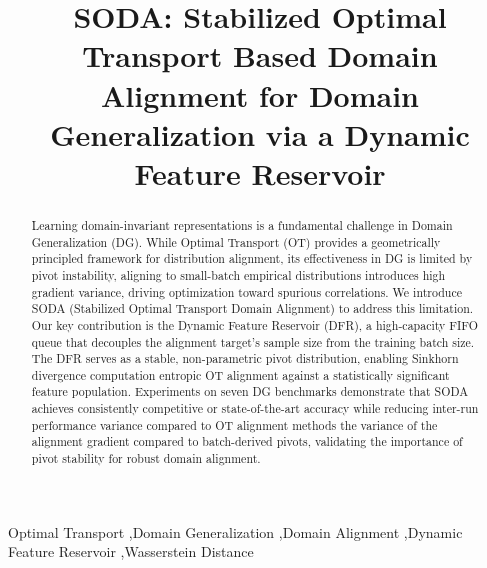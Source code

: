 \documentclass[preprint,12pt]{elsarticle}
\providecommand{\DIFadd}[1]{{\protect\color{blue} \sf #1}} %
\providecommand{\DIFdel}[1]{{\protect\color{red} \scriptsize #1}} %
\providecommand{\DIFaddbegin}{} %
\providecommand{\DIFaddend}{} %
\providecommand{\DIFdelbegin}{} %
\providecommand{\DIFdelend}{} %
\newcommand{\DIFscaledelfig}{0.5}
\newlength{\DIFdelgraphicswidth} %
\newlength{\DIFdelgraphicsheight} %
\newcommand{\DIFaddincludegraphics}[2][]{{\color{blue}\fbox{\DIFOincludegraphics[#1]{#2}}}} %
\newcommand{\DIFdelincludegraphics}[2][]{%
\sbox{\DIFdelgraphicsbox}{\DIFOincludegraphics[#1]{#2}}%
\settoboxwidth{\DIFdelgraphicswidth}{\DIFdelgraphicsbox} %
\settoboxtotalheight{\DIFdelgraphicsheight}{\DIFdelgraphicsbox} %
\scalebox{\DIFscaledelfig}{%
\parbox[b]{\DIFdelgraphicswidth}{\usebox{\DIFdelgraphicsbox}\\[-\baselineskip] \rule{\DIFdelgraphicswidth}{0em}}\llap{\resizebox{\DIFdelgraphicswidth}{\DIFdelgraphicsheight}{%
\setlength{\unitlength}{\DIFdelgraphicswidth}%
\begin{picture}(1,1)%
\thicklines\linethickness{2pt} %
{\color[rgb]{1,0,0}\put(0,0){\framebox(1,1){}}}%
{\color[rgb]{1,0,0}\put(0,0){\line( 1,1){1}}}%
{\color[rgb]{1,0,0}\put(0,1){\line(1,-1){1}}}%
\end{picture}%
}\hspace*{3pt}}} %
} %
\DeclareRobustCommand{\DIFaddbegin}{\DIFOaddbegin \let\includegraphics\DIFaddincludegraphics} %
\DeclareRobustCommand{\DIFaddend}{\DIFOaddend \let\includegraphics\DIFOincludegraphics} %
\DeclareRobustCommand{\DIFdelbegin}{\DIFOdelbegin \let\includegraphics\DIFdelincludegraphics} %
\DeclareRobustCommand{\DIFdelend}{\DIFOaddend \let\includegraphics\DIFOincludegraphics} %
\begin{document}
\begin{frontmatter}





\title{SODA: Stabilized Optimal Transport Based Domain Alignment for Domain Generalization via a Dynamic Feature Reservoir}














            
\begin{abstract}
Learning domain-invariant representations is a fundamental challenge in Domain Generalization (DG). While Optimal Transport (OT) provides a geometrically principled framework for distribution alignment, its effectiveness in DG is limited by pivot instability, aligning to small-batch empirical distributions introduces high gradient variance, driving optimization toward spurious correlations. We introduce SODA (Stabilized Optimal Transport Domain Alignment) to address this limitation. Our key contribution is the Dynamic Feature Reservoir (DFR), a high-capacity FIFO queue that decouples the alignment target's sample size from the training batch size. The DFR serves as a stable, non-parametric pivot distribution, enabling \DIFdelbegin \DIFdel{Sinkhorn divergence computation }\DIFdelend \DIFaddbegin \DIFadd{entropic OT alignment }\DIFaddend against a statistically significant feature population. Experiments on seven DG benchmarks demonstrate that SODA achieves consistently competitive or state-of-the-art accuracy while reducing \DIFdelbegin \DIFdel{inter-run performance variance compared to OT alignment methods}\DIFdelend \DIFaddbegin \DIFadd{the variance of the alignment gradient compared to batch-derived pivots}\DIFaddend , validating the importance of pivot stability for robust domain alignment.
\end{abstract}





\begin{keyword}




Optimal Transport \sep Domain Generalization \sep Domain Alignment \sep Dynamic Feature Reservoir \sep Wasserstein Distance 
\end{keyword}

\end{frontmatter}
\end{document}
